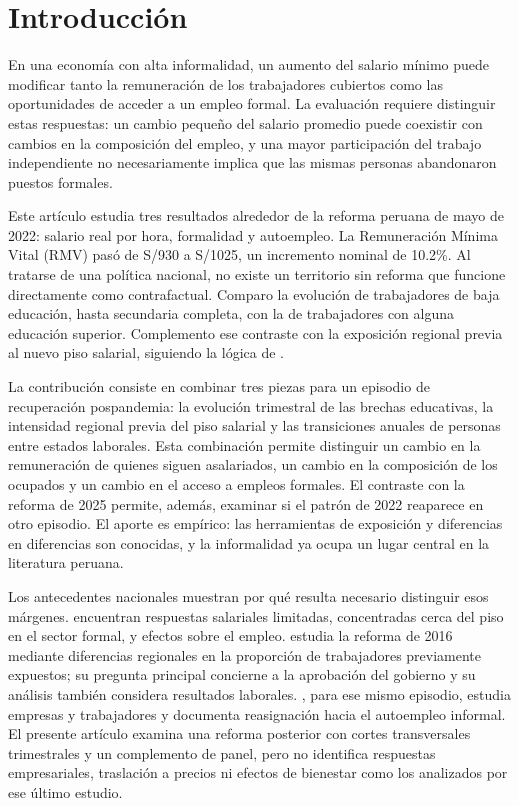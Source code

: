 \section{Introducción}

En una economía con alta informalidad, un aumento del salario mínimo puede modificar tanto la remuneración de los trabajadores cubiertos como las oportunidades de acceder a un empleo formal. La evaluación requiere distinguir estas respuestas: un cambio pequeño del salario promedio puede coexistir con cambios en la composición del empleo, y una mayor participación del trabajo independiente no necesariamente implica que las mismas personas abandonaron puestos formales.

Este artículo estudia tres resultados alrededor de la reforma peruana de mayo de 2022: salario real por hora, formalidad y autoempleo. La Remuneración Mínima Vital (RMV) pasó de S/930 a S/1025, un incremento nominal de 10.2\%. Al tratarse de una política nacional, no existe un territorio sin reforma que funcione directamente como contrafactual. Comparo la evolución de trabajadores de baja educación, hasta secundaria completa, con la de trabajadores con alguna educación superior. Complemento ese contraste con la exposición regional previa al nuevo piso salarial, siguiendo la lógica de \citet{card_1992}.

La contribución consiste en combinar tres piezas para un episodio de recuperación pospandemia: la evolución trimestral de las brechas educativas, la intensidad regional previa del piso salarial y las transiciones anuales de personas entre estados laborales. Esta combinación permite distinguir un cambio en la remuneración de quienes siguen asalariados, un cambio en la composición de los ocupados y un cambio en el acceso a empleos formales. El contraste con la reforma de 2025 permite, además, examinar si el patrón de 2022 reaparece en otro episodio. El aporte es empírico: las herramientas de exposición y diferencias en diferencias son conocidas, y la informalidad ya ocupa un lugar central en la literatura peruana.

Los antecedentes nacionales muestran por qué resulta necesario distinguir esos márgenes. \citet{jaramillo_lopez_2006} encuentran respuestas salariales limitadas, concentradas cerca del piso en el sector formal, y efectos sobre el empleo. \citet{jimenez_2023} estudia la reforma de 2016 mediante diferencias regionales en la proporción de trabajadores previamente expuestos; su pregunta principal concierne a la aprobación del gobierno y su análisis también considera resultados laborales. \citet{corcuera_2024}, para ese mismo episodio, estudia empresas y trabajadores y documenta reasignación hacia el autoempleo informal. El presente artículo examina una reforma posterior con cortes transversales trimestrales y un complemento de panel, pero no identifica respuestas empresariales, traslación a precios ni efectos de bienestar como los analizados por ese último estudio.

